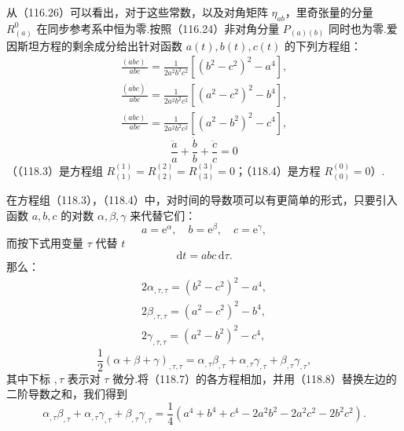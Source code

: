 从（116.26）可以看出，对于这些常数，以及对角矩阵 $\eta_{ab}$，里奇张量的分量 $R_{(a)}^{0}$ 在同步参考系中恒为零.按照（116.24）非对角分量 $P_{(a)(b)}$ 同时也为零.爱因斯坦方程的剩余成分给出针对函数 $a(t),b(t),c(t)$ 的下列方程组：
\begin{equation}
  \begin{gathered}
    \frac{(\dot{a}bc)^{\cdot}}{abc}
    =\frac{1}{2a^{2}b^{2}c^{2}}[(b^{2}-c^{2})^{2}-a^{4}],\\
    \frac{(a\dot{b}c)^{\cdot}}{abc}
    =\frac{1}{2a^{2}b^{2}c^{2}}[(a^{2}-c^{2})^{2}-b^{4}],\\
    \frac{(ab\dot{c})^{\cdot}}{abc}
    =\frac{1}{2a^{2}b^{2}c^{2}}[(a^{2}-b^{2})^{2}-c^{4}],
  \end{gathered}
\end{equation}
\begin{equation}
  \frac{\ddot{a}}{a}+\frac{\ddot{b}}{b}+\frac{\ddot{c}}{c}=0
\end{equation}
（（118.3）是方程组 $R_{(1)}^{(1)}=R_{(2)}^{(2)}=R_{(3)}^{(3)}=0$；（118.4）是方程 $R_{(0)}^{(0)}=0$）.

在方程组（118.3），（118.4）中，对时间的导数项可以有更简单的形式，只要引入函数 $a,b,c$ 的对数 $\alpha,\beta,\gamma$ 来代替它们：
\begin{equation}
  a=\mathrm{e}^{\alpha},\quad b=\mathrm{e}^{\beta},\quad c=\mathrm{e}^{\gamma},
\end{equation}
而按下式用变量 $\tau$ 代替 $t$
\begin{equation}
  \mathrm{d}t=abc\,\mathrm{d}\tau.
\end{equation}
那么：
\begin{equation}
  \begin{gathered}
    2\alpha_{,\tau,\tau}=(b^{2}-c^{2})^{2}-a^{4},\\
    2\beta_{,\tau,\tau}=(a^{2}-c^{2})^{2}-b^{4},\\
    2\gamma_{,\tau,\tau}=(a^{2}-b^{2})^{2}-c^{4},
  \end{gathered}
\end{equation}
\begin{equation}
  \frac{1}{2}(\alpha+\beta+\gamma)_{,\tau,\tau}
  =\alpha_{,\tau}\beta_{,\tau}
  +\alpha_{,\tau}\gamma_{,\tau}
  +\beta_{,\tau}\gamma_{,\tau},
\end{equation}
其中下标 $,\tau$ 表示对 $\tau$ 微分.将（118.7）的各方程相加，并用（118.8）替换左边的二阶导数之和，我们得到
\begin{equation}
  \alpha_{,\tau}\beta_{,\tau}
  +\alpha_{,\tau}\gamma_{,\tau}
  +\beta_{,\tau}\gamma_{,\tau}
  =\frac{1}{4}(a^{4}+b^{4}+c^{4}
  -2a^{2}b^{2}-2a^{2}c^{2}-2b^{2}c^{2}).
\end{equation}

